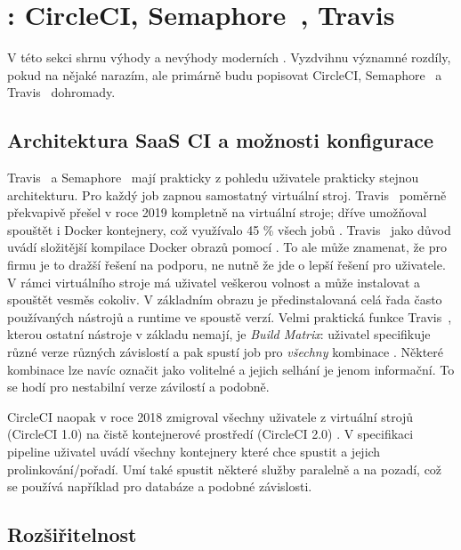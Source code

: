 \newcommand{\circleci}{\xspace{}CircleCI\xspace}
\newcommand{\travis}{\xspace{}Travis~\glstext{CI}\xspace}
\newcommand{\semaphore}{\xspace{}Semaphore~\xspace}

\section{: \circleci, \semaphore, \travis}
    V této sekci shrnu výhody a nevýhody moderních  \CI. Vyzdvihnu významné rozdíly, pokud na nějaké narazím, ale primárně budu popisovat \circleci, \semaphore a \travis dohromady.

    \subsection{Architektura SaaS CI a možnosti konfigurace}
        \travis a \semaphore mají prakticky z pohledu uživatele prakticky stejnou architekturu. Pro každý job zapnou samostatný virtuální stroj. \travis poměrně překvapivě přešel v roce 2019 kompletně na virtuální stroje; dříve umožňoval spouštět i Docker kontejnery, což využívalo 45 \% všech jobů \cite{travis-arch}. \travis jako důvod uvádí složitější kompilace Docker obrazů pomocí . To ale může znamenat, že pro firmu je to dražší řešení na podporu, ne nutně že jde o lepší řešení pro uživatele. V rámci virtuálního stroje má uživatel veškerou volnost a může instalovat a spouštět vesměs cokoliv. V základním obrazu je předinstalovaná celá řada často používaných nástrojů a runtime ve spoustě verzí. Velmi praktická funkce \travis, kterou ostatní \CI nástroje v základu nemají, je \textit{Build Matrix}: uživatel specifikuje různé verze různých závislostí a \CI pak spustí job pro \textit{všechny} kombinace \cite{travis-build-matrix}. Některé kombinace lze navíc označit jako volitelné a jejich selhání je jenom informační. To se hodí pro nestabilní  verze závilostí a podobně.

        \circleci naopak v roce 2018 zmigroval všechny uživatele z virtuální strojů (\circleci 1.0) na čistě kontejnerové prostředí (\circleci 2.0) \cite{circle-migration}. V specifikaci pipeline uživatel uvádí všechny kontejnery které chce spustit a jejich prolinkování/pořadí. Umí také spustit některé služby paralelně a na pozadí, což se používá například pro databáze a podobné závislosti.

    \subsection{Rozšiřitelnost}
        \blind[2]

